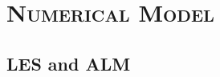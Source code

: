 \documentclass[xcolor=x11names,compress]{beamer}
\begin{document}
\section{\scshape Numerical Model}

\subsection{LES and ALM}
\end{document}
